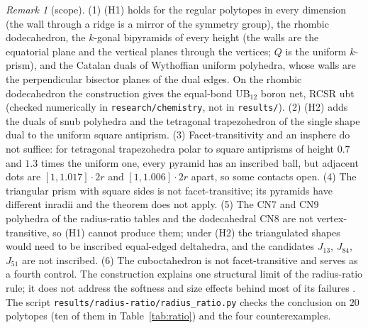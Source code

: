 \documentclass[11pt]{amsart}
\theoremstyle{definition}
\theoremstyle{remark}
\newtheorem{remark}{Remark}
\begin{document}
\begin{remark}[scope]\label{rem:scope}
(1) (H1) holds for the regular polytopes in every dimension (the wall through a ridge is a mirror of the symmetry group), the rhombic dodecahedron, the $k$-gonal bipyramids of every height (the walls are the equatorial plane and the vertical planes through the vertices; $Q$ is the uniform $k$-prism), and the Catalan duals of Wythoffian uniform polyhedra, whose walls are the perpendicular bisector planes of the dual edges. On the rhombic dodecahedron the construction gives the equal-bond UB$_{12}$ boron net, RCSR \textsf{ubt} \cite{RCSR} (checked numerically in \texttt{research/chemistry}, not in \texttt{results/}). (2) (H2) adds the duals of snub polyhedra and the tetragonal trapezohedron of the single shape dual to the uniform square antiprism. (3) Facet-transitivity and an insphere do not suffice: for tetragonal trapezohedra polar to square antiprisms of height $0.7$ and $1.3$ times the uniform one, every pyramid has an inscribed ball, but adjacent dots are $[1,1.017]\cdot2r$ and $[1,1.006]\cdot2r$ apart, so some contacts open. (4) The triangular prism with square sides is not facet-transitive; its pyramids have different inradii and the theorem does not apply. (5) The CN7 and CN9 polyhedra of the radius-ratio tables and the dodecahedral CN8 are not vertex-transitive, so (H1) cannot produce them; under (H2) the triangulated shapes would need to be inscribed equal-edged deltahedra, and the candidates $J_{13}$, $J_{84}$, $J_{51}$ are not inscribed. (6) The cuboctahedron is not facet-transitive and serves as a fourth control. The construction explains one structural limit of the radius-ratio rule; it does not address the softness and size effects behind most of its failures \cite{George2020}. The script \texttt{results/radius-ratio/radius\_ratio.py} checks the conclusion on $20$ polytopes (ten of them in Table~\ref{tab:ratio}) and the four counterexamples.
\end{remark}
\end{document}
